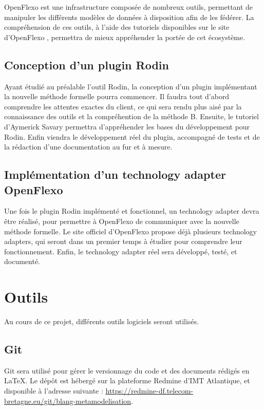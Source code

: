\documentclass{article}
\begin{document}
OpenFlexo est une infrastructure composée de nombreux outils, permettant de manipuler les différents modèles de données à disposition afin de les fédérer.
La compréhension de ces outils, à l'aide des tutoriels disponibles sur le site d'OpenFlexo \cite{openflexodoc}, permettra de mieux appréhender la portée de cet écosystème.

\subsection{Conception d'un plugin Rodin}

Ayant étudié au préalable l'outil Rodin, la conception d'un plugin implémentant la nouvelle méthode formelle pourra commencer.
Il faudra tout d'abord comprendre les attentes exactes du client, ce qui sera rendu plus aisé par la connaissance des outils et la compréhention de la méthode B.
Ensuite, le tutoriel d'Aymerick Savary \cite{asavary} permettra d'appréhender les bases du développement pour Rodin.
Enfin viendra le développement réel du plugin, accompagné de tests et de la rédaction d'une documentation au fur et à mesure.

\subsection{Implémentation d'un technology adapter OpenFlexo}

Une fois le plugin Rodin implémenté et fonctionnel, un technology adapter devra être réalisé, pour permettre à OpenFlexo de communiquer avec la nouvelle méthode formelle.
Le site officiel d'OpenFlexo \cite{openflexodoc} propose déjà plusieurs technology adapters, qui seront dans un premier temps à étudier pour comprendre leur fonctionnement.
Enfin, le technology adapter réel sera développé, testé, et documenté.


\section{Outils}

Au cours de ce projet, différents outils logiciels seront utilisés.

\subsection{Git}

Git sera utilisé pour gérer le versionnage du code et des documents rédigés en \LaTeX.
Le dépôt est hébergé sur la plateforme Redmine d'IMT Atlantique, et disponible à l'adresse suivante : \href{%
    https://redmine-df.telecom-bretagne.eu/git/blang-metamodelisation}{https://redmine-df.telecom-bretagne.eu/git/blang-metamodelisation}.
\end{document}
